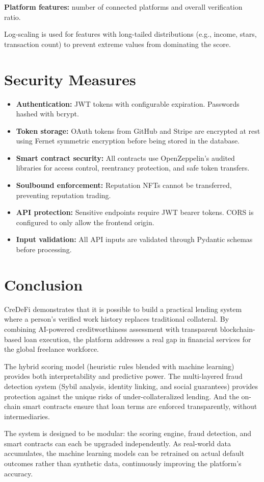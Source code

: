 \documentclass[12pt, a4paper]{article}
\begin{document}
\textbf{Platform features:} number of connected platforms and overall verification ratio.

Log-scaling is used for features with long-tailed distributions (e.g., income, stars, transaction count) to prevent extreme values from dominating the score.


\section{Security Measures}

\begin{itemize}[nosep]
    \item \textbf{Authentication:} JWT tokens with configurable expiration. Passwords hashed with bcrypt.
    \item \textbf{Token storage:} OAuth tokens from GitHub and Stripe are encrypted at rest using Fernet symmetric encryption before being stored in the database.
    \item \textbf{Smart contract security:} All contracts use OpenZeppelin's audited libraries for access control, reentrancy protection, and safe token transfers.
    \item \textbf{Soulbound enforcement:} Reputation NFTs cannot be transferred, preventing reputation trading.
    \item \textbf{API protection:} Sensitive endpoints require JWT bearer tokens. CORS is configured to only allow the frontend origin.
    \item \textbf{Input validation:} All API inputs are validated through Pydantic schemas before processing.
\end{itemize}


\section{Conclusion}

CreDeFi demonstrates that it is possible to build a practical lending system where a person's verified work history replaces traditional collateral. By combining AI-powered creditworthiness assessment with transparent blockchain-based loan execution, the platform addresses a real gap in financial services for the global freelance workforce.

The hybrid scoring model (heuristic rules blended with machine learning) provides both interpretability and predictive power. The multi-layered fraud detection system (Sybil analysis, identity linking, and social guarantees) provides protection against the unique risks of under-collateralized lending. And the on-chain smart contracts ensure that loan terms are enforced transparently, without intermediaries.

The system is designed to be modular: the scoring engine, fraud detection, and smart contracts can each be upgraded independently. As real-world data accumulates, the machine learning models can be retrained on actual default outcomes rather than synthetic data, continuously improving the platform's accuracy.
\end{document}
